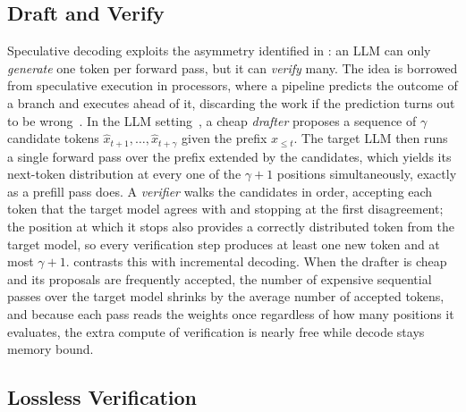 \subsection{Draft and Verify}
\label{background:subsec:draft_verify}

Speculative decoding exploits the asymmetry identified in : an LLM can only \emph{generate} one token per forward pass, but it can \emph{verify} many.
The idea is borrowed from speculative execution in processors, where a pipeline predicts the outcome of a branch and executes ahead of it, discarding the work if the prediction turns out to be wrong~\cite{burton1985speculative,gabbay1996speculative,smith1998study,hennessy2011computer}.
In the LLM setting~\cite{stern2018blockwise,leviathan2022fast,chen2023accelerating,xiaspeculative,gante2023assisted}, a cheap \emph{drafter} proposes a sequence of $\gamma$ candidate tokens $\hat{x}_{t+1}, \ldots, \hat{x}_{t+\gamma}$ given the prefix $x_{\le t}$.
The target LLM then runs a single forward pass over the prefix extended by the candidates, which yields its next-token distribution at every one of the $\gamma + 1$ positions simultaneously, exactly as a prefill pass does.
A \emph{verifier} walks the candidates in order, accepting each token that the target model agrees with and stopping at the first disagreement; the position at which it stops also provides a correctly distributed token from the target model, so every verification step produces at least one new token and at most $\gamma + 1$.
 contrasts this with incremental decoding.
When the drafter is cheap and its proposals are frequently accepted, the number of expensive sequential passes over the target model shrinks by the average number of accepted tokens, and because each pass reads the weights once regardless of how many positions it evaluates, the extra compute of verification is nearly free while decode stays memory bound.

\subsection{Lossless Verification}
\label{background:subsec:lossless}

